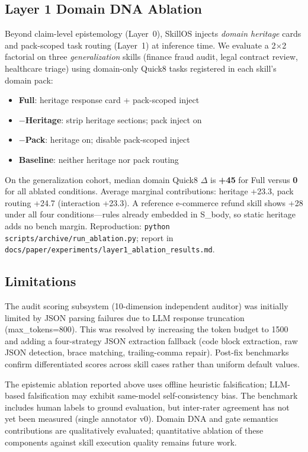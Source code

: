 \documentclass[11pt]{article}
\begin{document}
\subsection{Layer 1 Domain DNA Ablation}
\label{sec:layer1-ablation}

Beyond claim-level epistemology (Layer~0), SkillOS injects \emph{domain heritage} cards and pack-scoped task routing (Layer~1) at inference time. We evaluate a 2$\times$2 factorial on three \emph{generalization} skills (finance fraud audit, legal contract review, healthcare triage) using domain-only Quick8 tasks registered in each skill's domain pack:

\begin{itemize}[leftmargin=*,nosep]
    \item \textbf{Full}: heritage response card + pack-scoped inject
    \item \textbf{$-$Heritage}: strip heritage sections; pack inject on
    \item \textbf{$-$Pack}: heritage on; disable pack-scoped inject
    \item \textbf{Baseline}: neither heritage nor pack routing
\end{itemize}

On the generalization cohort, median domain Quick8 $\Delta$ is \textbf{+45} for Full versus \textbf{0} for all ablated conditions. Average marginal contributions: heritage +23.3, pack routing +24.7 (interaction +23.3). A reference e-commerce refund skill shows +28 under all four conditions---rules already embedded in S\_body, so static heritage adds no bench margin. Reproduction: \texttt{python scripts/archive/run\_ablation.py}; report in \texttt{docs/paper/experiments/layer1\_ablation\_results.md}.

\subsection{Limitations}

The audit scoring subsystem (10-dimension independent auditor) was initially limited by JSON parsing failures due to LLM response truncation (max\_tokens=800). This was resolved by increasing the token budget to 1500 and adding a four-strategy JSON extraction fallback (code block extraction, raw JSON detection, brace matching, trailing-comma repair). Post-fix benchmarks confirm differentiated scores across skill cases rather than uniform default values.

The epistemic ablation reported above uses offline heuristic falsification; LLM-based falsification may exhibit same-model self-consistency bias. The benchmark includes human labels to ground evaluation, but inter-rater agreement has not yet been measured (single annotator v0). Domain DNA and gate semantics contributions are qualitatively evaluated; quantitative ablation of these components against skill execution quality remains future work.
\end{document}
